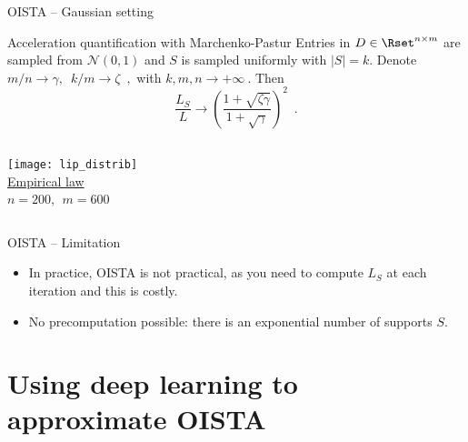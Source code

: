\documentclass{beamer}
\begin{document}
\begin{frame}{OISTA -- Gaussian setting}
    \begin{block}{Acceleration quantification with Marchenko-Pastur}
        Entries in $D \in \Rset^{n \times m}$ are sampled from $\mathcal N(0, 1)$ and $S$ is sampled uniformly with $|S| = k$.
        Denote $m/n \rightarrow \gamma, \enspace k /m \rightarrow \zeta \enspace ,$ with $k, m, n \rightarrow +\infty~.$ Then
        \begin{equation}
        \label{eq:ratioL}
        \frac{L_S}{L} \rightarrow \left(\frac{1 + \sqrt{\zeta\gamma}}{1 + \sqrt{\gamma}} \right)^2 \enspace.
        \end{equation}
    \end{block}
    \begin{columns}
        {\centering\texttt{[image: lip\_distrib]}\\}
        \underline{Empirical law}\\[.5em]
        $n=200, ~~ m = 600$
    \end{columns}

\end{frame}

\begin{frame}{OISTA -- Limitation}

\begin{itemize}
    \item In practice, OISTA is not practical, as you need to compute $L_S$ at each iteration and this is costly.\\[1em]
    \item No precomputation possible: there is an exponential number of supports $S$.
\end{itemize}

\end{frame}


\section{Using deep learning to approximate OISTA}
\parttitleframe{}
\end{document}
